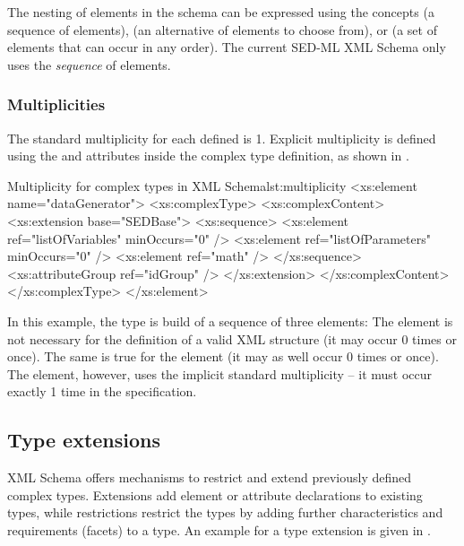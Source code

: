 The nesting of elements in the schema can be expressed using the concepts  (a sequence of elements),  (an alternative of elements to choose from), or  (a set of elements that can occur in any order). The current SED-ML XML Schema only uses the \emph{sequence} of elements. 


\subsubsection{Multiplicities}
The standard multiplicity for each defined  is 1. Explicit multiplicity is defined using the  and  attributes inside the complex type definition, as shown in .

\begin{myXmlLst}{Multiplicity for complex types in XML Schema}{lst:multiplicity}
<xs:element name="dataGenerator">
	<xs:complexType>
		<xs:complexContent>
			<xs:extension base="SEDBase">
				<xs:sequence>
					<xs:element ref="listOfVariables" minOccurs="0" />
					<xs:element ref="listOfParameters" minOccurs="0" />
					<xs:element ref="math" />
				</xs:sequence>
				<xs:attributeGroup ref="idGroup" />
			</xs:extension>
		</xs:complexContent>
	</xs:complexType>
</xs:element>
\end{myXmlLst}

In this example, the  type is build of a sequence of three elements: The  element is not necessary for the definition of a valid  XML structure (it may occur 0 times or once). The same is true for the  element (it may as well occur 0 times or once). The  element, however, uses the implicit standard multiplicity -- it must occur exactly 1 time in the  specification.

\subsection{Type extensions}
XML Schema offers mechanisms to restrict and extend previously defined complex types. Extensions add element or attribute declarations to existing types, while restrictions restrict the types by adding further characteristics and requirements (facets) to a type. An example for a type extension is given in .

